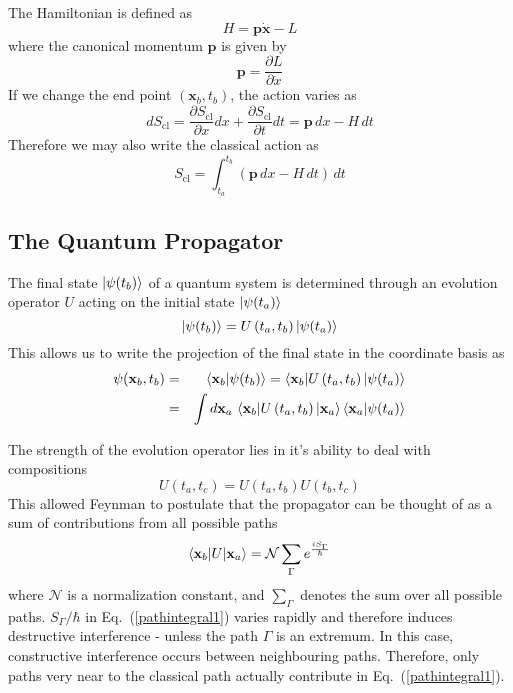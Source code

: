 \vspace{5mm}

The Hamiltonian is defined as 
\begin{equation}
H=\mathbf{p}\dot{\mathbf{x}}-L
\end{equation}
where the canonical momentum $\mathbf{p}$ is given by 
\begin{equation}
\mathbf{p}=\frac{\partial L}{\partial \dot{x}}
\end{equation}
If we change the end point $(\mathbf{x}_b,t_b)$, the action varies as
\begin{equation}
dS_{\mathrm{cl}}=\frac{\partial S_{\mathrm{cl}}}{\partial x}dx+\frac{\partial S_{\mathrm{cl}}}{\partial t}dt=\mathbf{p}\,dx-H\,dt
\end{equation}
Therefore we may also write the classical action as
\begin{equation}
S_{\mathrm{cl}}=\int^{t_b}_{t_a}\left(\mathbf{p}\,dx-H\,dt\right)\,dt
\end{equation}


\subsection{The Quantum Propagator}

The final state $\ket{\psi(t_b)}$ of a quantum system is determined through an evolution operator $U$ acting on the initial state $\ket{\psi(t_a)}$
\begin{equation}
\ket{\psi(t_b)}=U\left(t_a,t_b\right)\ket{\psi(t_a)}
\end{equation}
This allows us to write the projection of the final state in the coordinate basis as
\begin{eqnarray}
\psi(\mathbf{x}_b,t_b)&=&\braket{\mathbf{x}_b|\psi(t_b)}=\braket{\mathbf{x}_b|U\left(t_a,t_b\right)|\psi(t_a)} \nonumber \\
&=&\int d\mathbf{x}_a \, \braket{\mathbf{x}_b|U\left(t_a,t_b\right)|\mathbf{x}_a}\braket{\mathbf{x}_a|\psi(t_a)} 
\end{eqnarray}

The strength of the evolution operator lies in it's ability to deal with compositions
\begin{equation}
U\left(t_a,t_c\right)=U\left(t_a,t_b\right)U\left(t_b,t_c\right)
\end{equation}
This allowed Feynman to postulate that the propagator can be thought of as a sum of contributions from all possible paths
\begin{equation}
\braket{\mathbf{x}_b|U|\mathbf{x}_a}=\mathcal{N}\sum _{\Gamma}e^{\frac{iS_{\Gamma}}{\hbar}}
\label{pathintegral1}
\end{equation}
where $\mathcal{N}$ is a normalization constant, and $\sum_{\Gamma}$ denotes the sum over all possible paths. $S_{\Gamma}/\hbar$ in Eq.\ (\ref{pathintegral1}) varies rapidly and therefore induces destructive interference - unless the path $\Gamma$ is an extremum.  In this case, constructive interference occurs between neighbouring paths.  Therefore, only paths very near to the classical path actually contribute in Eq.\ (\ref{pathintegral1}). 

